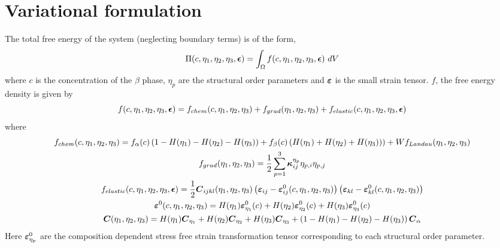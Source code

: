 \documentclass[11pt]{article}
\renewcommand{\=}[1]{\stackrel{#1}{=}} %
\theoremstyle{definition}
\theoremstyle{remark}
\def\Bepsilon{\mbox{\boldmath$\epsilon$}}
\def\Bkappa{\mbox{\boldmath$\kappa$}}
\def\Bvarepsilon{\mbox{\boldmath$\varepsilon$}}
\def\bC{\mbox{\boldmath$ C$}}
\begin{document}
\section{Variational formulation}
The total free energy of the system (neglecting boundary terms) is of the form,
\begin{equation}
\Pi(c, \eta_1, \eta_2, \eta_3, \Bepsilon) = \int_{\Omega} f(c, \eta_1, \eta_2, \eta_3, \Bepsilon) ~dV 
\end{equation}
where $c$ is the concentration of the $\beta$ phase, $\eta_p$ are the structural order parameters and $\Bvarepsilon$ is the small strain tensor. $f$, the free energy density is given by
\begin{equation}
 f(c, \eta_1, \eta_2, \eta_3, \Bepsilon) =   f_{chem}(c, \eta_1, \eta_2, \eta_3) + f_{grad}(\eta_1, \eta_2, \eta_3) + f_{elastic}(c,\eta_1, \eta_2, \eta_3,\Bepsilon)
\end{equation}
where
\begin{gather}
f_{chem}(c, \eta_1, \eta_2, \eta_3) = f_{\alpha}(c) \left( 1- H(\eta_1)-H(\eta_2)-H(\eta_3)\right) + f_{\beta}(c) \left(  H(\eta_1)  + H(\eta_2) + H(\eta_3)) \right) + W f_{Landau}(\eta_1, \eta_2, \eta_3) \\
f_{grad}(\eta_1, \eta_2, \eta_3) = \frac{1}{2} \sum_{p=1}^3 \Bkappa^{\eta_p}_{ij} \eta_{p,i}  \eta_{p,j} \\
f_{elastic}(c,\eta_1, \eta_2, \eta_3,\Bepsilon) = \frac{1}{2} \bC_{ijkl}(\eta_1, \eta_2, \eta_3)  \left( \Bvarepsilon_{ij} - \Bvarepsilon ^0_{ij}(c, \eta_1, \eta_2, \eta_3) \right)\left( \Bvarepsilon_{kl} - \Bvarepsilon^0_{kl}(c, \eta_1, \eta_2, \eta_3)\right) \\
\Bvarepsilon^0(c, \eta_1, \eta_2, \eta_3) = H(\eta_1) \Bvarepsilon^0_{\eta_1} (c)+ H(\eta_2) \Bvarepsilon^0_{\eta_2} (c) + H(\eta_3) \Bvarepsilon^0_{\eta_3} (c) \\
\bC(\eta_1, \eta_2, \eta_3) = H(\eta_1) \bC_{\eta_1}+ H(\eta_2) \bC_{\eta_2} + H(\eta_3) \bC_{\eta_3} + \left( 1- H(\eta_1)-H(\eta_2)-H(\eta_3)\right)  \bC_{\alpha}
\end{gather}
Here $\Bvarepsilon^0_{\eta_p}$ are the composition dependent stress free strain transformation tensor corresponding to each structural order parameter.
\end{document}
